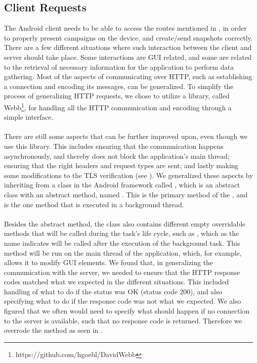 \subsection{Client Requests}
\label{sub:client_requests}

The Android client needs to be able to access the routes mentioned in , in order to properly present campaigns on the device, and create/send snapshots correctly. There are a few different situations where such interaction between the client and server should take place. Some interactions are GUI related, and some are related to the retrieval of necessary information for the application to perform data gathering. Most of the aspects of communicating over HTTP, such as establishing a connection and encoding its messages, can be generalized. To simplify the process of generalizing HTTP requests, we chose to utilize a library, called Webb\footnote{https://github.com/hgoebl/DavidWebb}, for handling all the HTTP communication and encoding through a simple interface. 
\\\\
There are still some aspects that can be further improved upon, even though we use this library. This includes ensuring that the communication happens asynchronously, and thereby does not block the application's main thread; ensuring that the right headers and request types are sent; and lastly making some modifications to the TLS verification (see ). We generalized these aspects by inheriting from a class in the Android framework called , which is an abstract class with an abstract method, named . This is the primary method of the , and is the one method that is executed in a background thread. 
\\\\
Besides the abstract method, the class also contains different empty overridable methods that will be called during the task's life cycle, such as , which as the name indicates will be called after the execution of the background task. This method will be run on the main thread of the application, which, for example, allows it to modify GUI elements. We found that, in generalizing the communication with the server, we needed to ensure that the HTTP response codes matched what we expected in the different situations. This included handling of what to do if the status was OK (status code 200), and also specifying what to do if the response code was not what we expected. We also figured that we often would need to specify what should happen if no connection to the server is available, such that no response code is returned. Therefore we overrode the  method as seen in . 

